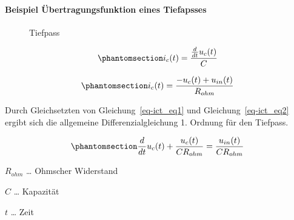 \documentclass[
  letterpaper,
  DIV=11]{scrreprt}
\let\oldparagraph\paragraph
\renewcommand{\paragraph}[1]{\oldparagraph{#1}\mbox{}}
\begin{document}
\paragraph{Beispiel Übertragungsfunktion eines
Tiefapsses}\label{beispiel-uxfcbertragungsfunktion-eines-tiefapsses}

\begin{figure}


\caption{\label{fig-Tiefpass}Tiefpass}

\end{figure}%

\begin{equation}\phantomsection\label{eq-ict_eq1}{
i_{c}{\left(t \right)} = \frac{\frac{d}{d t} u_{c}{\left(t \right)}}{C}
}\end{equation}

\begin{equation}\phantomsection\label{eq-ict_eq2}{
i_{c}{\left(t \right)} = \frac{- u_{c}{\left(t \right)} + u_{in}{\left(t \right)}}{R_{ohm}}
}\end{equation}

Durch Gleichsetzten von Gleichung~\ref{eq-ict_eq1} und
Gleichung~\ref{eq-ict_eq2} ergibt sich die allgemeine
Differenzialgleichung 1. Ordnung für den Tiefpass.

\begin{equation}\phantomsection\label{eq-RCTP}{
\frac{d}{d t} u_{c}{\left(t \right)} + \frac{u_{c}{\left(t \right)}}{C R_{ohm}} = \frac{u_{in}{\left(t \right)}}{C R_{ohm}}
}\end{equation}

\(R_{ohm}\) \ldots{} Ohmscher Widerstand

\(C\) \ldots{} Kapazität

\(t\) \ldots{} Zeit
\end{document}
